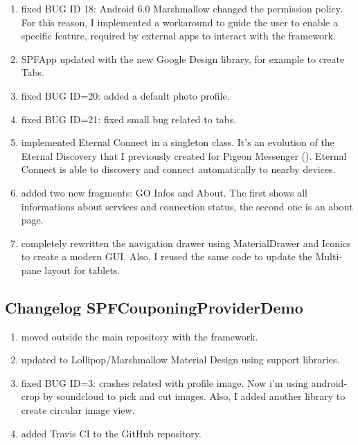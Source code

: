 \begin{enumerate}
	\item fixed BUG ID 18: Android 6.0 Marshmallow changed the permission policy. For this reason, I implemented a workaround to guide the user to enable a specific feature, required by external apps to interact with the framework.
	\item SPFApp updated with the new Google Design library, for example to create Tabs.
	\item fixed BUG ID=20: added a default photo profile.
	\item fixed BUG ID=21: fixed small bug related to tabs.
	\item implemented Eternal Connect in a singleton class. It's an evolution of the Eternal Discovery that I previously created for Pigeon Messenger (). Eternal Connect is able to discovery and connect automatically to nearby devices.
	\item added two new fragments: GO Infos and About. The first shows all informations about services and connection status, the second one is an about page.
	\item completely rewritten the navigation drawer using MaterialDrawer and Iconics to create a modern GUI. Also, I reused the same code to update the Multi-pane layout for tablets.
\end{enumerate}

\subsection*{Changelog SPFCouponingProviderDemo}
\begin{enumerate}
	\item moved outside the main repository with the framework.
	\item updated to Lollipop/Marshmallow Material Design using support libraries.
	\item fixed BUG ID=3: crashes related with profile image. Now i'm using android-crop by soundcloud to pick and cut images. Also, I added another library to create circular image view.	
	\item added Travis CI to the GitHub repository.
\end{enumerate}

